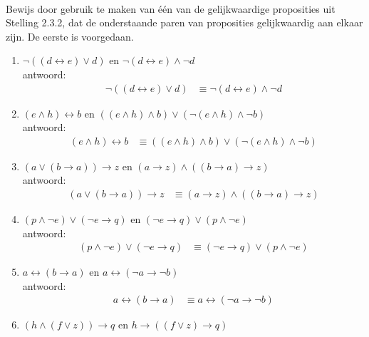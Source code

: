 \begin{answer}
\begin{enumerate}[label=\textit{\alph*.}]
\end{enumerate}
\end{answer}

\begin{answer}\mbox{}\\ %
Bewijs door gebruik te maken van één van de gelijkwaardige proposities uit Stelling 2.3.2, dat de onderstaande paren van proposities gelijkwaardig aan elkaar zijn. De eerste is voorgedaan.
\begin{enumerate}[label=\textit{\alph*.}]
\item $\neg ((d\leftrightarrow e)\vee d)$ en $\neg (d\leftrightarrow e) \wedge \neg d$ \\
antwoord:
\begin{align}
\neg ((d\leftrightarrow e)\vee d) &\equiv \neg (d\leftrightarrow e)\wedge \neg d  \tag{St-2.3.2: 9}
\end{align}
\item $(e\land h) \leftrightarrow b$ en $((e\land h) \land b) \lor (\neg (e\land h)\land \neg b)$\\
antwoord:
\begin{align}
(e\wedge h) \leftrightarrow b &\equiv ((e\wedge h)\wedge b)\vee (\neg (e\wedge h)\wedge \neg b)  \tag{St-2.3.2: 4}
\end{align}
\item $(a\lor (b\rightarrow a)) \rightarrow z$ en $(a\rightarrow z)\land ((b\rightarrow a) \rightarrow z)$ \\
antwoord:
\begin{align}
(a\vee (b\rightarrow a)) \rightarrow z &\equiv (a\rightarrow z) \wedge ((b\rightarrow a)\rightarrow z)  \tag{St-2.3.2:13}
\end{align}
\item $(p\land \neg e)\lor (\neg e \rightarrow q)$ en $(\neg e\rightarrow q)\lor (p\land \neg e)$ \\
antwoord:
\begin{align}
(p\wedge \neg e)\vee (\neg e\rightarrow q)&\equiv (\neg e\rightarrow q)\vee (p \land \neg e)  \tag{St-2.3.2: 2}
\end{align}
\item $a \leftrightarrow (b\rightarrow a)$ en $a \leftrightarrow (\neg a\rightarrow \neg b)$ \\
antwoord:
\begin{align}
a\leftrightarrow (b\rightarrow a) &\equiv a\leftrightarrow (\neg a \rightarrow \neg b) \tag{St-2.3.2: 7}
\end{align}
\item $(h \land (f\lor z))\rightarrow q$ en $h\rightarrow ((f\lor z) \rightarrow q)$ \\

\end{enumerate}
\end{answer}
